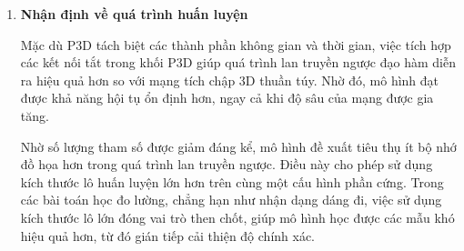 \begin{enumerate}





  \item \textbf{Nhận định về quá trình huấn luyện}

        Mặc dù P3D tách biệt các thành phần không gian và thời gian, việc tích hợp các kết nối tắt trong khối P3D giúp quá trình lan truyền ngược đạo hàm diễn ra hiệu quả hơn so với mạng tích chập 3D thuần túy. Nhờ đó, mô hình đạt được khả năng hội tụ ổn định hơn, ngay cả khi độ sâu của mạng được gia tăng.

        Nhờ số lượng tham số được giảm đáng kể, mô hình đề xuất tiêu thụ ít bộ nhớ đồ họa hơn trong quá trình lan truyền ngược. Điều này cho phép sử dụng kích thước lô huấn luyện lớn hơn trên cùng một cấu hình phần cứng. Trong các bài toán học đo lường, chẳng hạn như nhận dạng dáng đi, việc sử dụng kích thước lô lớn đóng vai trò then chốt, giúp mô hình học được các mẫu khó hiệu quả hơn, từ đó gián tiếp cải thiện độ chính xác.
\end{enumerate}

